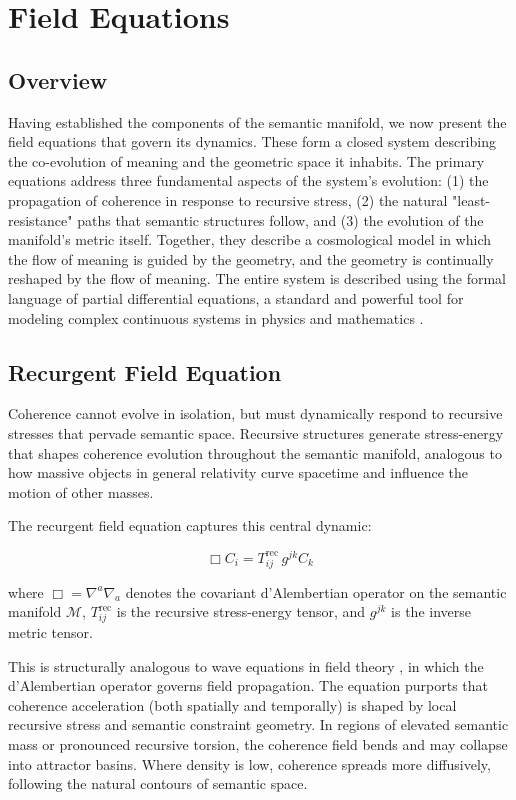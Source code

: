 \chapter{Field Equations}

\section{Overview}

Having established the components of the semantic manifold, we now present the field equations that govern its dynamics. These form a closed system describing the co-evolution of meaning and the geometric space it inhabits. The primary equations address three fundamental aspects of the system's evolution: (1) the propagation of coherence in response to recursive stress, (2) the natural "least-resistance" paths that semantic structures follow, and (3) the evolution of the manifold's metric itself. Together, they describe a cosmological model in which the flow of meaning is guided by the geometry, and the geometry is continually reshaped by the flow of meaning. The entire system is described using the formal language of partial differential equations, a standard and powerful tool for modeling complex continuous systems in physics and mathematics \autocite{Evans2010}.

\section{Recurgent Field Equation}

Coherence cannot evolve in isolation, but must dynamically respond to recursive stresses that pervade semantic space. Recursive structures generate stress-energy that shapes coherence evolution throughout the semantic manifold, analogous to how massive objects in general relativity curve spacetime and influence the motion of other masses.

The recurgent field equation captures this central dynamic:

\begin{equation}
\Box C_i = T^{\text{rec}}_{ij} \, g^{jk} C_k
\end{equation}

where \(\Box = \nabla^a \nabla_a\) denotes the covariant d'Alembertian operator on the semantic manifold \(\mathcal{M}\), \(T^{\text{rec}}_{ij}\) is the recursive stress-energy tensor, and \(g^{jk}\) is the inverse metric tensor.

This is structurally analogous to wave equations in field theory \autocite{Ryder1996, Weinberg1995}, in which the d'Alembertian operator governs field propagation. The equation purports that coherence acceleration (both spatially and temporally) is shaped by local recursive stress and semantic constraint geometry. In regions of elevated semantic mass or pronounced recursive torsion, the coherence field bends and may collapse into attractor basins. Where density is low, coherence spreads more diffusively, following the natural contours of semantic space.

